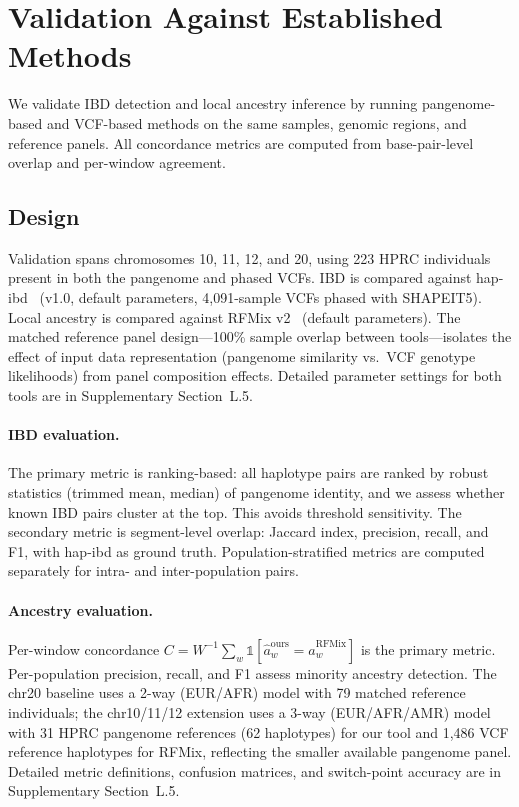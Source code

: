 \section{Validation Against Established Methods}
\label{sec:validation}

We validate IBD detection and local ancestry inference by running pangenome-based and VCF-based methods on the same samples, genomic regions, and reference panels. All concordance metrics are computed from base-pair-level overlap and per-window agreement.

\subsection{Design}

Validation spans chromosomes 10, 11, 12, and 20, using 223 HPRC individuals present in both the pangenome and phased VCFs. IBD is compared against hap-ibd~\cite{browning2020hap_ibd} (v1.0, default parameters, 4,091-sample VCFs phased with SHAPEIT5). Local ancestry is compared against RFMix v2~\cite{maples2013rfmix} (default parameters). The matched reference panel design---100\% sample overlap between tools---isolates the effect of input data representation (pangenome similarity vs.\ VCF genotype likelihoods) from panel composition effects. Detailed parameter settings for both tools are in Supplementary Section~L.5.

\paragraph{IBD evaluation.}
The primary metric is ranking-based: all haplotype pairs are ranked by robust statistics (trimmed mean, median) of pangenome identity, and we assess whether known IBD pairs cluster at the top. This avoids threshold sensitivity. The secondary metric is segment-level overlap: Jaccard index, precision, recall, and F1, with hap-ibd as ground truth. Population-stratified metrics are computed separately for intra- and inter-population pairs.

\paragraph{Ancestry evaluation.}
Per-window concordance $C = W^{-1}\sum_w \mathbb{1}[\hat{a}_w^{\text{ours}} = \hat{a}_w^{\text{RFMix}}]$ is the primary metric. Per-population precision, recall, and F1 assess minority ancestry detection. The chr20 baseline uses a 2-way (EUR/AFR) model with 79 matched reference individuals; the chr10/11/12 extension uses a 3-way (EUR/AFR/AMR) model with 31 HPRC pangenome references (62 haplotypes) for our tool and 1,486 VCF reference haplotypes for RFMix, reflecting the smaller available pangenome panel. Detailed metric definitions, confusion matrices, and switch-point accuracy are in Supplementary Section~L.5.
